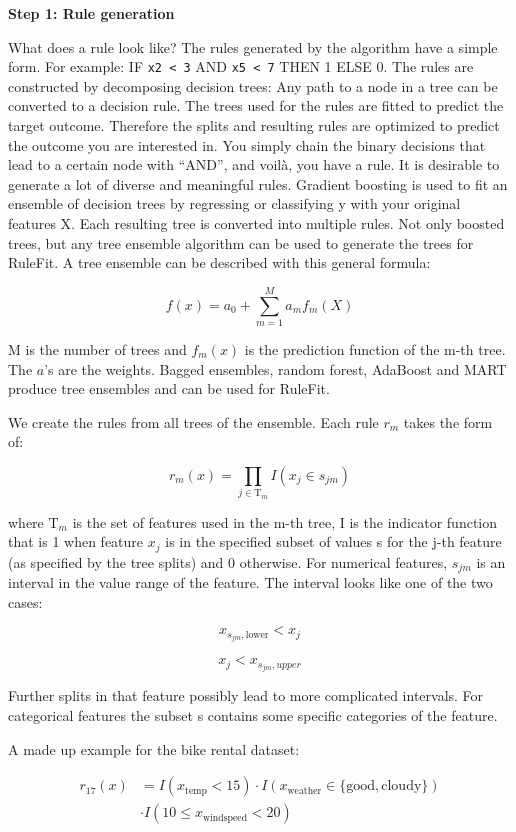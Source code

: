 \documentclass[
  12pt,
]{krantz}
\begin{document}
\textbf{Step 1: Rule generation}

What does a rule look like?
The rules generated by the algorithm have a simple form.
For example:
IF \texttt{x2\ \textless{}\ 3} AND \texttt{x5\ \textless{}\ 7} THEN 1 ELSE 0.
The rules are constructed by decomposing decision trees:
Any path to a node in a tree can be converted to a decision rule.
The trees used for the rules are fitted to predict the target outcome.
Therefore the splits and resulting rules are optimized to predict the outcome you are interested in.
You simply chain the binary decisions that lead to a certain node with ``AND'', and voilà, you have a rule.
It is desirable to generate a lot of diverse and meaningful rules.
Gradient boosting is used to fit an ensemble of decision trees by regressing or classifying y with your original features X.
Each resulting tree is converted into multiple rules.
Not only boosted trees, but any tree ensemble algorithm can be used to generate the trees for RuleFit.
A tree ensemble can be described with this general formula:

\[f(x)=a_0+\sum_{m=1}^M{}a_m{}f_m(X)\]

M is the number of trees and \(f_m(x)\) is the prediction function of the m-th tree.
The \(a\)'s are the weights.
Bagged ensembles, random forest, AdaBoost and MART produce tree ensembles and can be used for RuleFit.

We create the rules from all trees of the ensemble.
Each rule \(r_m\) takes the form of:

\[r_m(x)=\prod_{j\in\text{T}_m}I(x_j\in{}s_{jm})\]

where \(\text{T}_{m}\) is the set of features used in the m-th tree, I is the indicator function that is 1 when feature \(x_j\) is in the specified subset of values s for the j-th feature (as specified by the tree splits) and 0 otherwise.
For numerical features, \(s_{jm}\) is an interval in the value range of the feature.
The interval looks like one of the two cases:

\[x_{s_{jm},\text{lower}}<x_j\]

\[x_j<x_{s_{jm},upper}\]

Further splits in that feature possibly lead to more complicated intervals.
For categorical features the subset s contains some specific categories of the feature.

A made up example for the bike rental dataset:

\begin{align*}
r_{17}(x) & = I(x_{\text{temp}}<15) \cdot I(x_{\text{weather}}\in\{\text{good},\text{cloudy}\}) \\
            & \cdot I(10\leq x_{\text{windspeed}}<20) 
\end{align*}
\end{document}
